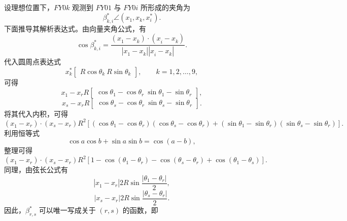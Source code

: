 \documentclass[UTF-8,a4paper,zihao=-4]{ctexart}
\begin{document}
设理想位置下，$FY0k$ 观测到 $FY01$ 与 $FY0i$ 所形成的夹角为
\begin{equation}
\beta_{k,i}^{*}
\angle\left(x_1^{},x_k^{},x_i^{*}\right).
\end{equation}
下面推导其解析表达式。由向量夹角公式，有
\begin{equation}
\cos \beta_{k,i}^{*}=
\frac{ \left(x_1^{}-x_k^{}\right)\cdot\left(x_i^{}-x_k^{}\right) }{ \left|x_1^{}-x_k^{}\right| \left|x_i^{}-x_k^{}\right| }.
\end{equation}
代入圆周点表达式
\begin{equation}
x_k^{*}
\begin{bmatrix} R\cos\theta_k^{}\ R\sin\theta_k^{} \end{bmatrix}, \qquad k=1,2,\dots,9,
\end{equation}
可得
\begin{equation}
x_1^{}-x_r^{}
R \begin{bmatrix} \cos\theta_1^{}-\cos\theta_r^{}\ \sin\theta_1^{}-\sin\theta_r^{} \end{bmatrix},
\end{equation}
\begin{equation}
x_s^{}-x_r^{}
R \begin{bmatrix} \cos\theta_s^{}-\cos\theta_r^{}\ \sin\theta_s^{}-\sin\theta_r^{} \end{bmatrix}.
\end{equation}
将其代入内积，可得
\begin{equation}
\left(x_1^{}-x_r^{}\right)\cdot\left(x_s^{}-x_r^{}\right)
R^2 \left[ (\cos\theta_1^{}-\cos\theta_r^{})(\cos\theta_s^{}-\cos\theta_r^{}) + (\sin\theta_1^{}-\sin\theta_r^{})(\sin\theta_s^{}-\sin\theta_r^{}) \right].
\end{equation}
利用恒等式
$$ \cos a \cos b + \sin a \sin b = \cos(a-b), $$
整理可得
\begin{equation}
\left(x_1^{}-x_r^{}\right)\cdot\left(x_s^{}-x_r^{}\right)
R^2 \left[ 1-\cos(\theta_1^{}-\theta_r^{}) -\cos(\theta_s^{}-\theta_r^{}) +\cos(\theta_1^{}-\theta_s^{}) \right].
\end{equation}
同理，由弦长公式有
\begin{equation}
\left|x_1^{}-x_r^{}\right|
2R\sin\frac{\left|\theta_1^{}-\theta_r^{}\right|}{2},
\end{equation}
\begin{equation}
\left|x_s^{}-x_r^{}\right|
2R\sin\frac{\left|\theta_s^{}-\theta_r^{}\right|}{2}.
\end{equation}
因此，$\beta_{r,s}^{*}$ 可以唯一写成关于 $(r,s)$ 的函数，即
\end{document}
